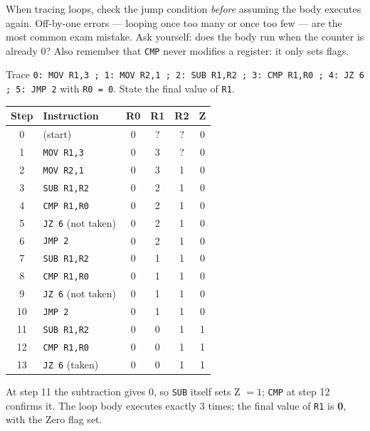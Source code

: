 \documentclass[11pt]{article}
\begin{document}
\begin{attention}
When tracing loops, check the jump condition \emph{before} assuming the body executes again. Off-by-one errors — looping once too many or once too few — are the most common exam mistake. Ask yourself: does the body run when the counter is already 0? Also remember that \texttt{CMP} never modifies a register: it only sets flags.
\end{attention}

\begin{exoresolu}
Trace \texttt{0: MOV R1,3 ; 1: MOV R2,1 ; 2: SUB R1,R2 ; 3: CMP R1,R0 ; 4: JZ 6 ; 5: JMP 2} with \texttt{R0 = 0}. State the final value of \texttt{R1}.
\tcblower
\begin{center}
\begin{tabular}{|c|l|c|c|c|c|}
\hline
\rowcolor{popblueL} \textbf{Step} & \textbf{Instruction} & \textbf{R0} & \textbf{R1} & \textbf{R2} & \textbf{Z} \\
\hline
0 & (start) & 0 & ? & ? & 0 \\
1 & \texttt{MOV R1,3} & 0 & 3 & ? & 0 \\
2 & \texttt{MOV R2,1} & 0 & 3 & 1 & 0 \\
3 & \texttt{SUB R1,R2} & 0 & 2 & 1 & 0 \\
4 & \texttt{CMP R1,R0} & 0 & 2 & 1 & 0 \\
5 & \texttt{JZ 6} (not taken) & 0 & 2 & 1 & 0 \\
6 & \texttt{JMP 2} & 0 & 2 & 1 & 0 \\
7 & \texttt{SUB R1,R2} & 0 & 1 & 1 & 0 \\
8 & \texttt{CMP R1,R0} & 0 & 1 & 1 & 0 \\
9 & \texttt{JZ 6} (not taken) & 0 & 1 & 1 & 0 \\
10 & \texttt{JMP 2} & 0 & 1 & 1 & 0 \\
11 & \texttt{SUB R1,R2} & 0 & 0 & 1 & 1 \\
12 & \texttt{CMP R1,R0} & 0 & 0 & 1 & 1 \\
13 & \texttt{JZ 6} (taken) & 0 & 0 & 1 & 1 \\
\hline
\end{tabular}
\end{center}
At step 11 the subtraction gives 0, so \texttt{SUB} itself sets Z $= 1$; \texttt{CMP} at step 12 confirms it. The loop body executes exactly 3 times; the final value of \texttt{R1} is \textbf{0}, with the Zero flag set.
\end{exoresolu}
\end{document}

